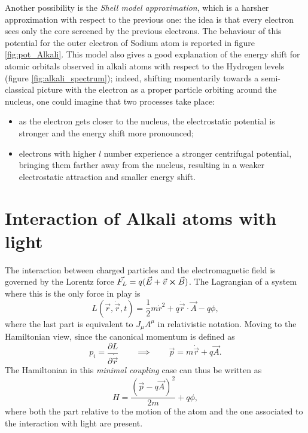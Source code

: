 Another possibility is the \textit{Shell model approximation}, which is a harsher approximation with respect to the previous one: the idea is that every electron sees only the core screened by the previous electrons. The behaviour of this potential for the outer electron of Sodium atom is reported in figure \ref{fig:pot_Alkali}. This model also gives a good explanation of the energy shift for atomic orbitals observed in alkali atoms with respect to the Hydrogen levels (figure \ref{fig:alkali_spectrum}); indeed, shifting momentarily towards a semi-classical picture with the electron as a proper particle orbiting around the nucleus, one could imagine that two processes take place:
\begin{itemize}
    \item as the electron gets closer to the nucleus, the electrostatic potential is stronger and the energy shift more pronounced;
    \item electrons with higher $l$ number experience a stronger centrifugal potential, bringing them farther away from the nucleus, resulting in a weaker electrostatic attraction and smaller energy shift.
\end{itemize}



\section{Interaction of Alkali atoms with light}
The interaction between charged particles and the electromagnetic field is governed by the Lorentz force $\Vec{F_L}=q(\Vec{E}+\Vec{v}\cross\Vec{B})$. The Lagrangian of a system where this is the only force in play is 
\begin{equation*}
    L(\Vec{r}, \Dot{\Vec{r}}, t)=\frac{1}{2} m \Dot{r}^2 + q \Dot{\Vec{r}}\cdot\Vec{A}- q \phi,
\end{equation*}
where the last part is equivalent to $J_\mu A^\mu$ in relativistic notation. Moving to the Hamiltonian view, since the canonical momentum is defined as 
\begin{equation*}
    p_i=\frac{\partial L}{\partial \Dot{\Vec{r}}} \qquad \implies \qquad \Vec{p}=m\Dot{\Vec{r}}+q\Vec{A}. 
\end{equation*}
The Hamiltonian in this \textit{minimal coupling} case can thus be written as 
\begin{equation}
    H= \frac{(\Vec{p}-q\Vec{A})^2}{2m}+q\phi, 
    \label{eq:Hatomlight}
\end{equation}
where both the part relative to the motion of the atom and the one associated to the interaction with light are present. 

